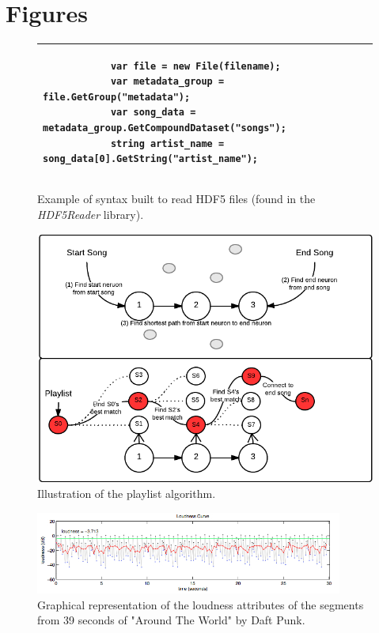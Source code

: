 \section{Figures} %
\label{sec:list_of_figures}


\begin{figure}[h!]
	\begin{tabular}{|p{\textwidth}|}
		\hline
		\begin{verbatim}
			var file = new File(filename);
			var metadata_group = file.GetGroup("metadata");
			var song_data = metadata_group.GetCompoundDataset("songs");
			string artist_name = song_data[0].GetString("artist_name");
		\end{verbatim} \\
		\hline
	\end{tabular}
	\caption{Example of syntax built to read HDF5 files (found in the \emph{HDF5Reader} library).}
    \label{fig:hdf5-syntax}
\end{figure}

\begin{figure}[h!]
	\centering
	\includegraphics[width=\textwidth]{figures/playlist-generation}
	\caption{Illustration of the playlist algorithm.}
    \label{fig:playlist-gen}
\end{figure}

\begin{figure}[h!]
    \centering
    \includegraphics[width=0.9\textwidth]{figures/loudness.jpg}
    \caption{Graphical representation of the loudness attributes of the segments from 39 seconds of "Around The World" by Daft Punk.}
    \label{fig:loudness}
\end{figure}

